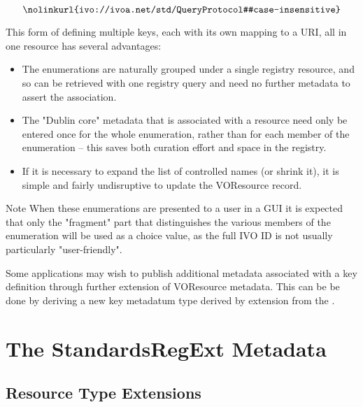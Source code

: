 \documentclass[11pt,a4paper]{ivoa}
\begin{document}
$$
\hbox{\nolinkurl{ivo://ivoa.net/std/QueryProtocol#case-insensitive}}
$$


This form of defining multiple keys, each with its own mapping to a
URI, all in one resource has several advantages:



\begin{itemize}

\item  The enumerations are naturally grouped under a single registry
       resource, and so can be retrieved with one registry query and
       need no further metadata to assert the association.

\item  The "Dublin core" metadata that is associated with a resource
       need only be entered once for the whole enumeration, rather
       than for each member of the enumeration -- this  saves both
       curation effort and space in the registry.

\item  If it is necessary to expand the list of controlled names (or
       shrink it), it is simple and fairly undisruptive to update the
       VOResource record.

\end{itemize}

\begin{admonition}{Note}
       When these enumerations are presented to a user in a GUI it is
       expected that only the "fragment" part that distinguishes
       the various members of the enumeration will be used as a choice
       value, as the full IVO ID is not usually particularly
       "user-friendly". 
\end{admonition}

Some applications may wish to publish additional metadata associated
with a key definition through further extension of VOResource
metadata.  This can be be done by deriving a new key metadatum type
derived by extension from the .  



\section{The StandardsRegExt Metadata}

\subsection{Resource Type Extensions}
\end{document}
